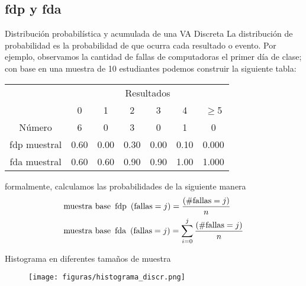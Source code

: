 \subsection{fdp y fda}
{\small
	\begin{frame}{Distribución probabilística y acumulada de una VA Discreta}
		La distribución de probabilidad es la probabilidad de que ocurra cada resultado o evento. Por ejemplo, observamos la cantidad de fallas de computadoras el primer día de clase; con base en una muestra de 10 estudiantes podemos construir la siguiente tabla:
		\begin{table}[!htbp]
			\centering
			\begin{tabular}{*7c}
				\hline
				{} &  \multicolumn{6}{c}{Resultados} \\
				{} & 0 & 1 & 2 & 3 & 4 & $\geq$5\\
				\hline
				Número  	 & 6 	& 0    & 3    & 0    & 1    & 0     \\
				fdp muestral & 0.60 & 0.00 & 0.30 & 0.00 & 0.10 & 0.000 \\
				fda muestral & 0.60 & 0.60 & 0.90 & 0.90 & 1.00 & 1.000 \\
				\hline
			\end{tabular}
		\end{table}
		formalmente, calculamos las probabilidades de la siguiente manera
		\begin{align*}
			&\textup{muestra base\, fdp}\enskip (\textup{fallas}=j) = \frac{(\#\textup{fallas}=j)}{n}\\
			&\textup{muestra base\, fda}\enskip (\textup{fallas}=j) = \sum_{i=0}^{j} 	\frac{(\#\textup{fallas}=j)}{n}
		\end{align*}
\end{frame}}
\begin{frame}{Histograma en diferentes tamaños de muestra}
	\begin{figure}
		\centering
		\texttt{[image: figuras/histograma\_discr.png]}
	\end{figure}
\end{frame}
